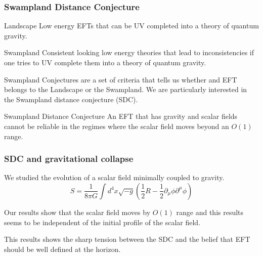 \documentclass[hyperref={bookmarks=false},aspectratio=169]{beamer}
\begin{document}
\begin{frame}
    \frametitle{Swampland Distance Conjecture}

    \begin{block}{Landscape}
        Low energy EFTs that can be UV completed into a theory of quantum gravity.
    \end{block}
    \begin{block}{Swampland}
        Consistent looking low energy theories that lead to inconsistencies if one tries to UV complete them into a theory of quantum gravity.
    \end{block}

    Swampland Conjectures are a set of criteria that tells us whether and EFT belongs to the Landscape or the Swampland. We are particularly interested in the Swampland distance conjecture (SDC).
    \begin{alertblock}{Swampland Distance Conjecture}
        An EFT that has gravity and scalar fields cannot be reliable in the regimes where the scalar field moves beyond an $O(1)$ range.
    \end{alertblock}

\end{frame}


\begin{frame}
    \frametitle{SDC and gravitational collapse}

    We studied the evolution of a scalar field minimally coupled to gravity.
    \begin{equation}
        S=\frac{1}{8 \pi G} \int d^{4} x \sqrt{-g}\left(\frac{1}{2} R-\frac{1}{2} \partial_{\mu} \phi \partial^{\mu} \phi\right)
        \label{eqn:action}
    \end{equation}

    \begin{alertblock}{}
        Our results show that the scalar field moves by $O(1)$ range and this results seems to be independent of the initial profile of the scalar field.
    \end{alertblock}

    This results shows the sharp tension between the SDC and the belief that EFT should be well defined at the horizon.


\end{frame}


\end{document}
